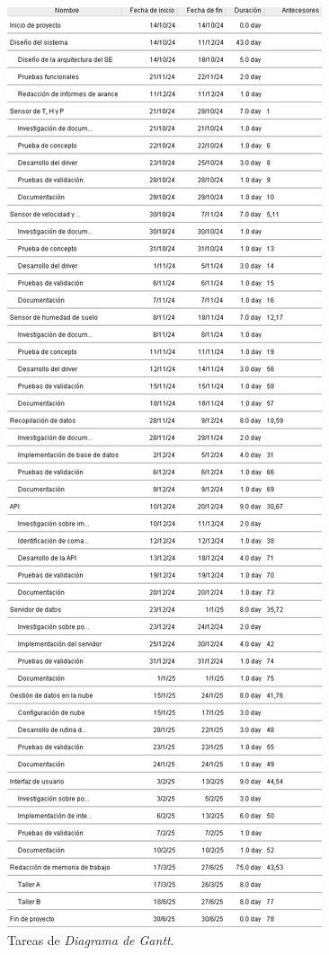 \documentclass[
11pt, %
]{charter}
\begin{document}
\begin{figure}[htpb]
\centering 
\includegraphics[width=.65\textwidth, height=.74\textheight]{./Figuras/GdP_T.png}
\caption{Tareas de \textit{Diagrama de Gantt}.}
\label{fig:ganttTasks}
\end{figure}
\end{document}
